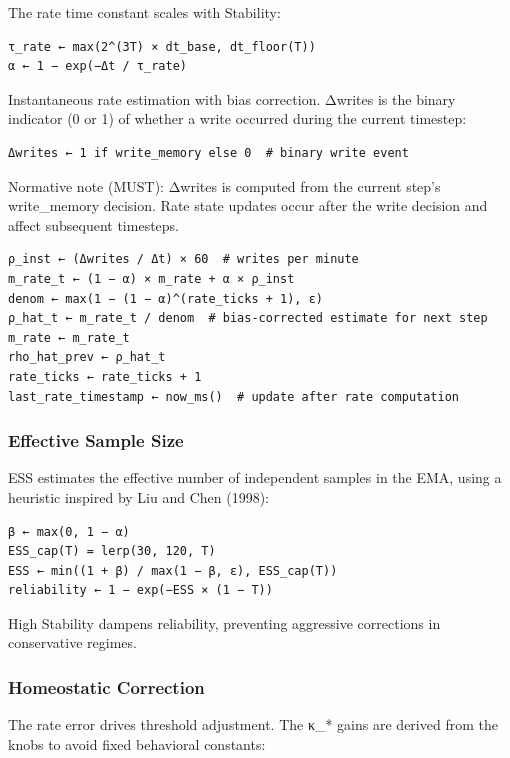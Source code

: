 \documentclass[
  letterpaper,
  DIV=11,
  numbers=noendperiod]{scrartcl}
\begin{document}
The rate time constant scales with Stability:

\begin{verbatim}
τ_rate ← max(2^(3T) × dt_base, dt_floor(T))
α ← 1 − exp(−Δt / τ_rate)
\end{verbatim}

Instantaneous rate estimation with bias correction. Δwrites is the
binary indicator (0 or 1) of whether a write occurred during the current
timestep:

\begin{verbatim}
Δwrites ← 1 if write_memory else 0  # binary write event
\end{verbatim}

Normative note (MUST): Δwrites is computed from the current step's
write\_memory decision. Rate state updates occur after the write
decision and affect subsequent timesteps.

\begin{verbatim}
ρ_inst ← (Δwrites / Δt) × 60  # writes per minute
m_rate_t ← (1 − α) × m_rate + α × ρ_inst
denom ← max(1 − (1 − α)^(rate_ticks + 1), ε)
ρ_hat_t ← m_rate_t / denom  # bias-corrected estimate for next step
m_rate ← m_rate_t
rho_hat_prev ← ρ_hat_t
rate_ticks ← rate_ticks + 1
last_rate_timestamp ← now_ms()  # update after rate computation
\end{verbatim}

\subsubsection{Effective Sample Size}\label{effective-sample-size}

ESS estimates the effective number of independent samples in the EMA,
using a heuristic inspired by Liu and Chen (1998):

\begin{verbatim}
β ← max(0, 1 − α)
ESS_cap(T) = lerp(30, 120, T)
ESS ← min((1 + β) / max(1 − β, ε), ESS_cap(T))
reliability ← 1 − exp(−ESS × (1 − T))
\end{verbatim}

High Stability dampens reliability, preventing aggressive corrections in
conservative regimes.

\subsubsection{Homeostatic Correction}\label{homeostatic-correction}

The rate error drives threshold adjustment. The κ\_* gains are derived
from the knobs to avoid fixed behavioral constants:
\end{document}
